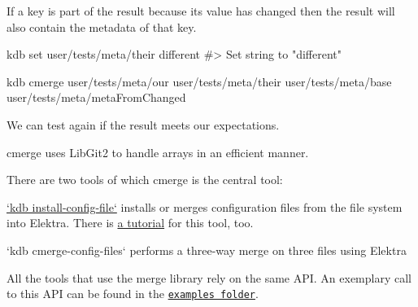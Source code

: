 If a key is part of the result because its value has changed then the result will also contain the metadata of that key.


\begin{DoxyCode}
kdb set user/tests/meta/their different
#> Set string to "different"

kdb cmerge user/tests/meta/our user/tests/meta/their user/tests/meta/base user/tests/meta/metaFromChanged
\end{DoxyCode}


We can test again if the result meets our expectations.




cmerge uses Lib\+Git2 to handle arrays in an efficient manner.




There are two tools of which cmerge is the central tool\+:


\begin{DoxyEnumerate}
\item \hyperlink{doc_help_kdb-install-config-file_md}{`kdb install-\/config-\/file`} installs or merges configuration files from the file system into Elektra. There is \hyperlink{doc_tutorials_install-config-files_md}{a tutorial} for this tool, too.
\item `kdb cmerge-\/config-\/files` performs a three-\/way merge on three files using Elektra
\end{DoxyEnumerate}

All the tools that use the merge library rely on the same A\+PI. An exemplary call to this A\+PI can be found in the \href{/home/jenkins/workspace/libelektra-release/examples/kdbset.c}{\tt examples folder}. 